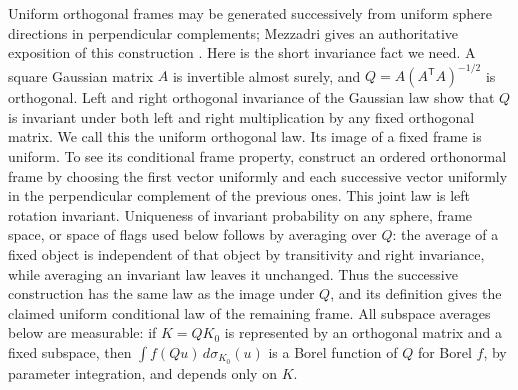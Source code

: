 Uniform orthogonal frames may be generated successively from uniform
sphere directions in perpendicular complements; Mezzadri gives an
authoritative exposition of this construction
\cite[Section~8, Theorem~4 and Corollary~1]{Mezzadri2007}.
Here is the short invariance fact we need. A square Gaussian matrix
\(A\) is invertible almost surely, and
\(Q=A(A^{\mathsf T}A)^{-1/2}\) is orthogonal. Left and right
orthogonal invariance of the Gaussian law show that \(Q\) is invariant
under both left and right multiplication by any fixed orthogonal
matrix. We call this the uniform orthogonal law. Its image of a fixed
frame is uniform. To see its conditional frame property, construct an
ordered orthonormal frame by choosing the first vector uniformly and
each successive vector uniformly in the perpendicular complement of
the previous ones. This joint law is left rotation invariant.
Uniqueness of invariant probability on any sphere, frame
space, or space of flags used below follows by averaging over \(Q\):
the average of a fixed object is independent of that object by
transitivity and right invariance, while averaging an invariant law
leaves it unchanged. Thus the successive construction has the same law
as the image under \(Q\), and its definition gives the claimed uniform
conditional law of the remaining frame.
All subspace averages below are measurable: if \(K=QK_0\) is represented
by an orthogonal matrix and a fixed subspace, then
\(\int f(Qu)\,d\sigma_{K_0}(u)\) is a Borel function of \(Q\) for
Borel \(f\), by parameter integration, and depends only on \(K\).

